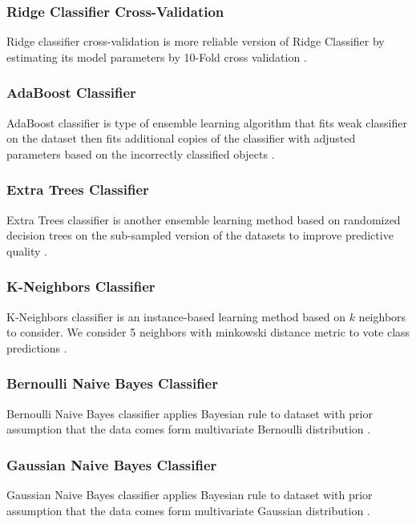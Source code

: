 \documentclass[10pt, twocolumn, letterpaper]{article}
\begin{document}
\subsubsection{Ridge Classifier Cross-Validation}
Ridge classifier cross-validation is more reliable version of Ridge Classifier by estimating its model parameters by 10-Fold cross validation \cite{scikit-learn}.

\subsubsection{AdaBoost Classifier}
AdaBoost classifier is type of ensemble learning algorithm that fits weak classifier on the dataset then fits additional copies of the classifier with adjusted parameters based on the incorrectly classified objects \cite{scikit-learn}.

\subsubsection{Extra Trees Classifier}
Extra Trees classifier is another ensemble learning method based on randomized decision trees on the sub-sampled version of the datasets to improve predictive quality \cite{scikit-learn}.

\subsubsection{K-Neighbors Classifier}
K-Neighbors classifier is an instance-based learning method based on $k$ neighbors to consider. We consider 5 neighbors with minkowski distance metric to vote class predictions \cite{scikit-learn}.

\subsubsection{Bernoulli Naive Bayes Classifier}
Bernoulli Naive Bayes classifier applies Bayesian rule to dataset with prior assumption that the data comes form multivariate Bernoulli distribution \cite{scikit-learn}.

\subsubsection{Gaussian Naive Bayes Classifier}
Gaussian Naive Bayes classifier applies Bayesian rule to dataset with prior assumption that the data comes form multivariate Gaussian distribution \cite{scikit-learn}.
\end{document}
